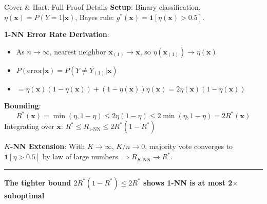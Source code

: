 \documentclass[8pt,aspectratio=169]{beamer}
\newcommand{\bottomnote}[1]{%
\vfill
\vspace{-2mm}
\textcolor{mllavender2}{\rule{\textwidth}{0.4pt}}
\vspace{1mm}
\footnotesize
\textbf{#1}
}
\begin{document}
\begin{frame}[t]{Cover \& Hart: Full Proof Details}
\textbf{Setup}: Binary classification, $\eta(\mathbf{x}) = P(Y=1|\mathbf{x})$, Bayes rule: $g^*(\mathbf{x}) = \mathbf{1}[\eta(\mathbf{x}) > 0.5]$.

\textbf{1-NN Error Rate Derivation}:
\begin{itemize}
\item As $n \to \infty$, nearest neighbor $\mathbf{x}_{(1)} \to \mathbf{x}$, so $\eta(\mathbf{x}_{(1)}) \to \eta(\mathbf{x})$
\item $P(\text{error} | \mathbf{x}) = P(Y \neq Y_{(1)} | \mathbf{x})$
\item $= \eta(\mathbf{x})(1-\eta(\mathbf{x})) + (1-\eta(\mathbf{x}))\eta(\mathbf{x}) = 2\eta(\mathbf{x})(1-\eta(\mathbf{x}))$
\end{itemize}
\vspace{0.3em}
\textbf{Bounding}:
$$R^*(\mathbf{x}) = \min(\eta, 1-\eta) \leq 2\eta(1-\eta) \leq 2\min(\eta,1-\eta) = 2R^*(\mathbf{x})$$
Integrating over $\mathbf{x}$: $R^* \leq R_{1\text{-NN}} \leq 2R^*(1-R^*)$
\vspace{0.3em}

\textbf{$K$-NN Extension}: With $K \to \infty$, $K/n \to 0$, majority vote converges to $\mathbf{1}[\eta > 0.5]$ by law of large numbers $\Rightarrow R_{K\text{-NN}} \to R^*$.
\bottomnote{The tighter bound $2R^*(1-R^*) \leq 2R^*$ shows 1-NN is at most 2$\times$ suboptimal}
\end{frame}
\end{document}
